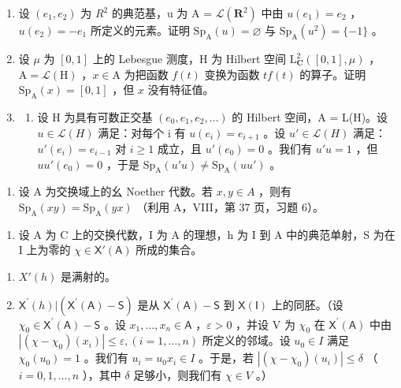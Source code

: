 

\begin{enumerate}
\def\labelenumi{\arabic{enumi})}
\item
  设 \((e_{1}, e_{2})\) 为 \(R^{2}\) 的典范基，u 为 A = \(\mathcal{L}(\mathbf{R}^{2})\) 中由 \(u(e_{1}) = e_{2}\) ，\(u(e_{2}) = -e_{1}\) 所定义的元素。证明 \(\mathrm{Sp}_{\mathrm{A}}(u) = \varnothing\) 与 \(\mathrm{Sp}_{\mathrm{A}}(u^{2}) = \{-1\}\) 。
\item
  设 \(\mu\) 为 \([0,1]\) 上的 Lebesgue 测度，H 为 Hilbert 空间 \(\mathrm{L}_{\mathbf{C}}^{2}([0,1],\mu)\) ，\(\mathrm{A} = \mathcal{L}(\mathrm{H})\) ，\(x \in \mathrm{A}\) 为把函数 \(f(t)\) 变换为函数 \(tf(t)\) 的算子。证明 \(\mathrm{Sp}_{\mathrm{A}}(x) = [0,1]\) ，但 \(x\) 没有特征值。
\item
  \begin{enumerate}
  \def\labelenumii{\alph{enumii})}
  \tightlist
  \item
    设 H 为具有可数正交基 \((e_{0}, e_{1}, e_{2}, \ldots)\) 的 Hilbert 空间，A = L(H)。设 \(u \in \mathcal{L}(H)\) 满足：对每个 i 有 \(u(e_{i}) = e_{i+1}\) 。设 \(u' \in \mathcal{L}(H)\) 满足：\(u'(e_{i}) = e_{i-1}\) 对 \(i \geqslant 1\) 成立，且 \(u'(e_{0}) = 0\) 。我们有 \(u'u = 1\) ，但 \(uu'(e_{0}) = 0\) ，于是 \(\mathrm{Sp}_{\mathrm{A}}(u'u) \neq \mathrm{Sp}_{\mathrm{A}}(uu')\) 。
  \end{enumerate}
\end{enumerate}

\begin{enumerate}
\def\labelenumi{\alph{enumi})}
\setcounter{enumi}{1}
\tightlist
\item
  设 A 为交换域上的幺 Noether 代数。若 \(x, y \in A\) ，则有 \(\mathrm{Sp}_{\mathrm{A}}(xy) = \mathrm{Sp}_{\mathrm{A}}(yx)\) （利用 A，VIII，第 37 页，习题 6）。
\end{enumerate}

\begin{enumerate}
\def\labelenumi{\arabic{enumi})}
\setcounter{enumi}{3}
\tightlist
\item
  设 A 为 C 上的交换代数，I 为 A 的理想，h 为 I 到 A 中的典范单射，S 为在 I 上为零的 \(\chi \in \mathsf{X}'(\mathsf{A})\) 所成的集合。
\end{enumerate}

\begin{enumerate}
\def\labelenumi{\alph{enumi})}
\item
  \(X'(h)\) 是满射的。
\item
  \(\mathsf{X}^{\prime}(h)|(\mathsf{X}^{\prime}(\mathsf{A})-\mathsf{S})\) 是从 \(\mathsf{X}^{\prime}(\mathsf{A})-\mathsf{S}\) 到 \(\mathsf{X}(\mathsf{I})\) 上的同胚。（设 \(\chi_{0}\in\mathsf{X}^{\prime}(\mathsf{A})-\mathsf{S}\) 。设 \(x_{1},\ldots,x_{n}\in\mathsf{A}\) ，\(\varepsilon>0\) ，并设 V 为 \(\chi_{0}\) 在 \(\mathsf{X}^{\prime}(\mathsf{A})\) 中由 \(|(\chi-\chi_{0})(x_{i})|\leqslant\varepsilon,(i=1,\ldots,n)\) 所定义的邻域。设 \(u_{0}\in I\) 满足 \(\chi_0(u_0) = 1\) 。我们有 \(u_i = u_0x_i \in I\) 。于是，若 \(|(\chi - \chi_0)(u_i)| \leqslant \delta\) （ \(i = 0, 1, \ldots, n\) ），其中 \(\delta\) 足够小，则我们有 \(\chi \in V\) 。）
\end{enumerate}


